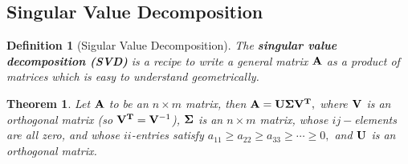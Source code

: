 \documentclass[12pt, a4paper]{article}
\newtheorem{thm}{Theorem}[subsection]
\newtheorem{df}{Definition}[subsection]
\def\T{{\vb{T}}}
\def\matrixA{\vb{A}}
\def\matrixU{\vb{U}}
\def\matrixV{\vb{V}}
\def\matrixSig{\vb{\Sigma}}
\begin{document}
\subsection{Singular Value Decomposition}
\begin{df}[Sigular Value Decomposition]
	The \textbf{singular value decomposition (SVD)} is a recipe to write a general matrix $\matrixA$ as a product of matrices which is easy to understand geometrically. 
\end{df}
\begin{thm}
	Let $\matrixA$ to be an $n\times m$ matrix, then $\matrixA=\matrixU\matrixSig\matrixV^\T,$ where $\matrixV$ is an orthogonal matrix (so $\matrixV^\T=\matrixV^{-1}$), $\matrixSig$ is an $n\times m$ matrix, whose $ij-$elements are all zero, and whose $ii$-entries	satisfy $a_{11}\geq a_{22}\geq a_{33}\geq\cdots\geq0,$ and $\matrixU$ is an orthogonal matrix. 
\end{thm}
\end{document}
